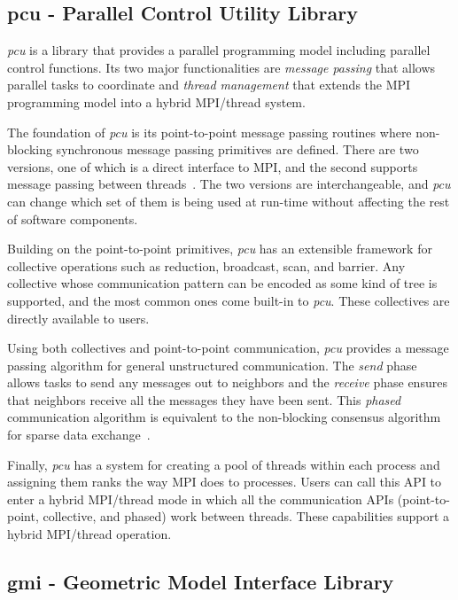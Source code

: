 \subsection{pcu - Parallel Control Utility Library}
\emph{pcu} is a library that provides a parallel programming model including 
parallel control functions.
Its two major functionalities are \emph{message passing} that allows parallel tasks to 
coordinate and \emph{thread management} that extends the MPI programming model 
into a hybrid MPI/thread system.

The foundation of \emph{pcu} is its point-to-point message passing routines where 
non-blocking synchronous message passing primitives are defined. There are 
two versions, one of which is a direct interface to MPI, and the second supports 
message passing between threads~\cite{dan-supcomp14}. The two versions 
are interchangeable, and \emph{pcu} can change which set of them is being used at 
run-time without affecting the rest of software components.

Building on the point-to-point primitives, \emph{pcu} has an extensible framework for
collective operations such as reduction, broadcast, scan, and barrier.
Any collective whose communication pattern can be encoded as some kind of tree
is supported, and the most common ones come built-in to \emph{pcu}.
These collectives are directly available to users.

Using both collectives and point-to-point communication, \emph{pcu} provides a message 
passing algorithm for general unstructured communication. The \emph{send} phase 
allows tasks to send any messages out to neighbors and 
the \emph{receive} phase ensures that neighbors 
receive all the messages they have been sent. This \emph{phased} communication algorithm is 
equivalent to the non-blocking consensus algorithm
for sparse data exchange~\cite{hoefler2010scalable}.

Finally, \emph{pcu} has a system for creating a pool of threads within each process and 
assigning them ranks the way MPI does to processes.
Users can call this API to enter a hybrid MPI/thread mode in which all the 
communication APIs (point-to-point, collective, and phased) work between 
threads. These capabilities support a hybrid MPI/thread operation.

\subsection{gmi - Geometric Model Interface Library}

